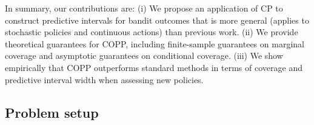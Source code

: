 In summary, our contributions are: 
(i) We propose an application of CP to construct predictive intervals for bandit outcomes that is more general (applies to stochastic policies and continuous actions) than previous work.
(ii) We provide theoretical guarantees for COPP, including finite-sample guarantees on marginal coverage and asymptotic guarantees on conditional coverage.
(iii) We show empirically that COPP outperforms standard methods in terms of coverage and predictive interval width when assessing new policies. 

\subsection{Problem setup}\label{sec:problem_setup}

